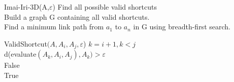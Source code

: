 \begin{algorithm}{Imai-Iri-3D}{(A,$\varepsilon$)}
 Find all possible valid shortcuts \\
Build a graph G containing all valid shortcuts. \\
Find a minimum link path from $a_{1}$ to $a_{n}$  in G using breadth-first search.
      \end{algorithm} 
      
      \begin{algorithm}{ValidShortcut}{$(A, A_{i},A_{j},\varepsilon$)}
      \qfor $k = i+1, k < j$\\
       \qif d(evaluate$(A_{k},A_{i},A_{j}), A_{k}) > \varepsilon$ \\ 
       \qreturn False \qfi \qrof \\
       \qreturn True
      \end{algorithm} 
      